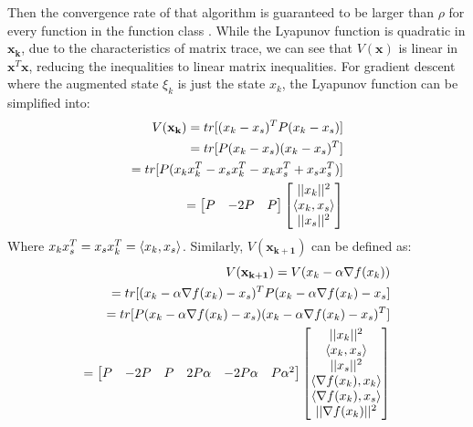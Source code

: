  Then the convergence rate of that algorithm is guaranteed to be larger than $\rho $ for every function in the function class . While the Lyapunov function is quadratic in $\mathbf{x_k}$, due to the characteristics of matrix trace, we can see that $V(\mathbf{x})$ is linear in $\mathbf{x}^T\mathbf{x}$, reducing the inequalities to linear matrix inequalities. For gradient descent where the augmented state $\xi_k$ is just the state $x_k$, the Lyapunov function can be simplified into:
\begin{subequations}  \label{eqn:Vx}
	\begin{align*}
		V(\mathbf{x_{k}}) = tr[(x_k - x_s)^TP(x_k - x_s)]\\
						  = tr[P(x_k - x_s)(x_k - x_s)^T]\\
						  = tr[P(x_kx_k^T - x_sx_k^T - x_kx_s^T + x_sx_s^T)] \\
						  = \begin{bmatrix}P & -2P & P\end{bmatrix}\begin{bmatrix}||x_k||^2 \\ \langle x_k, x_s \rangle \\ ||x_s||^2\end{bmatrix}
	\end{align*}
\end{subequations}
Where $x_kx_s^T = x_sx_k^T = \langle x_k, x_s \rangle$. Similarly, $V(\mathbf{x_{k+1}})$ can be defined as:
\begin{subequations}  \label{eqn:Vx+}
	\begin{align*}
		V(\mathbf{x_{k+1}}) = V(x_k - \alpha \nabla f(x_k)) \\
						  	= tr[(x_k - \alpha \nabla f(x_k) - x_s)^TP(x_k - \alpha \nabla f(x_k) - x_s]\\
						  	= tr[P(x_k - \alpha \nabla f(x_k) - x_s)(x_k - \alpha \nabla f(x_k) - x_s)^T]\\
						  	= \begin{bmatrix}P & -2P & P & 2P\alpha & -2P\alpha & P\alpha^2\end{bmatrix}\begin{bmatrix}||x_k||^2 \\ \langle x_k, x_s \rangle \\ ||x_s||^2 \\ \langle \nabla f(x_k), x_k \rangle \\ \langle \nabla f(x_k), x_s \rangle \\ ||\nabla f(x_k)||^2\end{bmatrix}
	\end{align*}
\end{subequations}

